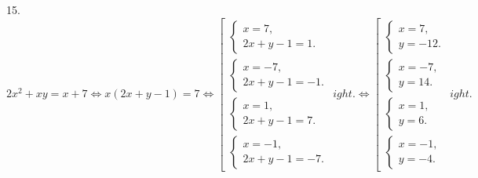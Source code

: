 15. $2x^2+xy=x+7\Leftrightarrow x(2x+y-1)=7\Leftrightarrow \left[\begin{array}{l} \begin{cases}x=7,\\  2x+y-1=1.\end{cases}\\ \begin{cases}x=-7,\\  2x+y-1=-1.\end{cases}\\\begin{cases}x=1,\\  2x+y-1=7.\end{cases}\\\begin{cases}x=-1,\\  2x+y-1=-7.\end{cases} \end{array}
ight.
\Leftrightarrow \left[\begin{array}{l} \begin{cases}x=7,\\  y=-12.\end{cases}\\ \begin{cases}x=-7,\\  y=14.\end{cases}\\\begin{cases}x=1,\\  y=6.\end{cases}\\\begin{cases}x=-1,\\  y=-4.\end{cases} \end{array}
ight.$\\
